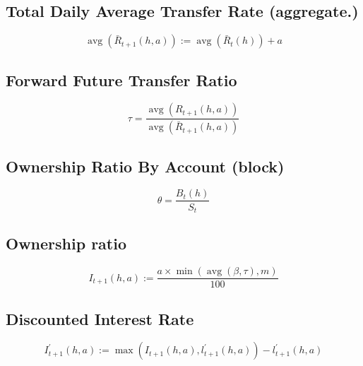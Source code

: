 \begin{tcolorbox}
\subsection{Total Daily Average Transfer Rate (aggregate.)}
\label{total.aggregate.daily.avg.transfer.rate}
\begin{equation}
\operatorname{avg}\left(\bar{R}_{t+1}(h, a)\right):=\operatorname{avg}\left(\bar{R}_{t}(h)\right)+a
\end{equation}
\end{tcolorbox}

\begin{tcolorbox}
\subsection{Forward Future Transfer Ratio}
\begin{equation}
\tau=\frac{\operatorname{avg}\left(R_{t+1}(h, a)\right)}{\operatorname{avg}\left(\bar{R}_{t+1}(h, a)\right)}
\end{equation}
\end{tcolorbox}

\begin{tcolorbox}
\subsection{Ownership Ratio By Account (block) }
\begin{equation}
\theta=\frac{B_{t}(h)}{S_{t}}
\end{equation}
\end{tcolorbox}

\begin{tcolorbox}
\subsection{Ownership ratio}
\label{Interest Rate}
\begin{equation}
I_{t+1}(h, a):=\frac{a \times \min (\operatorname{avg}(\beta, \tau), m)}{100}
\end{equation}
\end{tcolorbox}

\begin{tcolorbox}
\subsection{Discounted Interest Rate}
\label{Discounted Interest Rate}
\begin{equation}
I_{t+1}^{\prime}(h, a):=\max \left(I_{t+1}(h, a), l_{t+1}^{\prime}(h, a)\right)-l_{t+1}^{\prime}(h, a)
\end{equation}
\end{tcolorbox}


